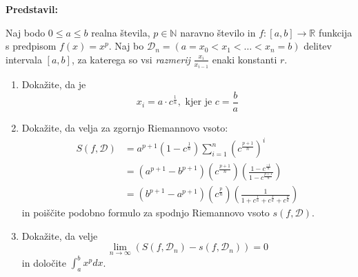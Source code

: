 \textbf{Predstavil:} 

Naj bodo $0 \leq a \leq b$ realna števila, $p \in \mathbb{N}$ naravno število in $f: [a,b] \to \mathbb{R}$ funkcija s predpisom $f(x) = x^{p}$. Naj bo $\mathcal{D}_{n} = (a=x_{0} <  x_{1} < \dots < x_{n}=b)$ delitev intervala $[a,b]$, za katerega so vsi \textit{razmerij} $\frac{x_{i}}{x_{i-1}}$ enaki konstanti $r$. 
\begin{enumerate}
  \item Dokažite, da je \[x_{i} = a \cdot c^{\frac{1}{n}}, \text{ kjer je } c= \frac{b}{a}\]
  \item Dokažite, da velja za zgornjo Riemannovo vsoto:
  \[\begin{aligned}
  S(f,\mathcal{D}) 
  &= a^{p+1}\left(  1-c^{\frac{1}{n}}\right)\sum_{i=1}^{n} \left( c^{\frac{p+1}{n}} \right)^{i} \\
  &= \left( a^{p+1} - b^{p+1} \right)\left( c^{\frac{p+1}{n}} \right)\left( \frac{1-c^{\frac{-1}{n}}}{1-c^{\frac{p+1}{n}}} \right)\\
  &= \left( b^{p+1} - a^{p+1} \right)\left( c^{\frac{p}{n}} \right)\left( \frac{1}{1+c^{\frac{1}{n}} + c^{\frac{2}{n}} + c^{\frac{p}{n}}} \right)
  \end{aligned}\] in poiščite podobno formulo za spodnjo Riemannovo vsoto $s(f,\mathcal{D})$. 
  \item Dokažite, da velje \[ \lim_{n \to \infty} \left( S(f,\mathcal{D}_{n}) - s(f,\mathcal{D}_{n}) \right) = 0\] in določite $\int_{a}^{b} x^{p} dx$.
\end{enumerate}